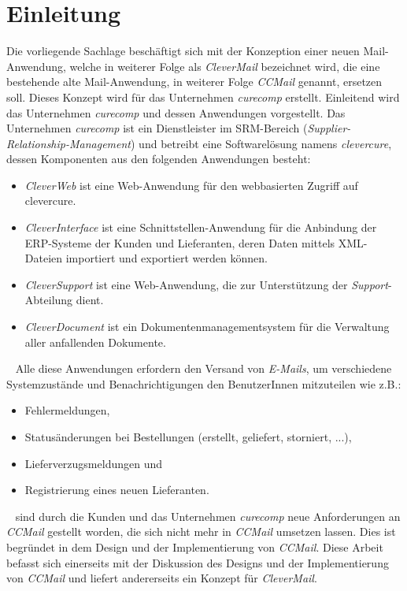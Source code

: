 \chapter{Einleitung}
\label{cha:einleitung}
Die vorliegende Sachlage beschäftigt sich mit der Konzeption einer neuen Mail-Anwendung, welche in weiterer Folge als \emph{CleverMail} bezeichnet wird, die eine bestehende alte Mail-Anwendung, in weiterer Folge \emph{CCMail} genannt, ersetzen soll. Dieses Konzept wird für das Unternehmen \emph{curecomp} erstellt. Einleitend wird das Unternehmen \emph{curecomp} und dessen Anwendungen vorgestellt. 
\newline
\newline
Das Unternehmen \emph{curecomp} ist ein Dienstleister im SRM-Bereich (\emph{Supplier-Relationship-Management}) und betreibt eine Softwarelösung namens \emph{clevercure}, dessen Komponenten aus den folgenden Anwendungen besteht:
\begin{itemize}
	\item\emph{CleverWeb} ist eine Web-Anwendung für den webbasierten Zugriff auf clevercure.
	\item\emph{CleverInterface} ist eine Schnittstellen-Anwendung für die Anbindung der ERP-Systeme der Kunden und Lieferanten, deren Daten mittels XML-Dateien	importiert und exportiert werden können.
	\item\emph{CleverSupport} ist eine Web-Anwendung, die zur Unterstützung der \emph{Support}-Abteilung dient.
	\item\emph{CleverDocument} ist ein Dokumentenmanagementsystem für die Verwaltung aller anfallenden Dokumente.
\end{itemize} 
\ \newline
Alle diese Anwendungen erfordern den Versand von \emph{E-Mails}, um verschiedene Systemzustände und Benachrichtigungen den BenutzerInnen mitzuteilen wie z.B.:
\begin{itemize}
	\item Fehlermeldungen,
	\item Statusänderungen bei Bestellungen (erstellt, geliefert, storniert, ...),
	\item Lieferverzugsmeldungen und
	\item Registrierung eines neuen Lieferanten.
\end{itemize}
\ \newpage
{} sind durch die Kunden und das Unternehmen \emph{curecomp} neue Anforderungen an \emph{CCMail} gestellt worden, die sich nicht mehr in \emph{CCMail} umsetzen lassen. Dies ist begründet in dem Design und der Implementierung von \emph{CCMail}. Diese Arbeit befasst sich einerseits mit der Diskussion des Designs und der Implementierung von \emph{CCMail} und liefert andererseits ein Konzept für \emph{CleverMail}.
